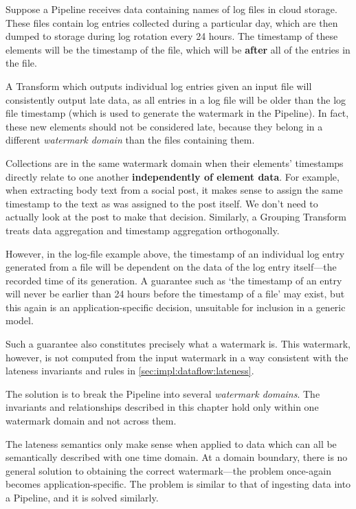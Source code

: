Suppose a Pipeline receives data containing names of log files in cloud storage.
These files contain log entries collected during a particular day, which are then dumped to storage during log rotation every 24 hours.
The timestamp of these elements will be the timestamp of the file, which will be \textbf{after} all of the entries in the file.

A Transform which outputs individual log entries given an input file will consistently output late data, as all entries in a log file will be older than the log file timestamp (which is used to generate the watermark in the Pipeline).
In fact, these new elements should not be considered late, because they belong in a different \emph{watermark domain} than the files containing them.

Collections are in the same watermark domain when their elements' timestamps directly relate to one another \textbf{independently of element data}.
For example, when extracting body text from a social post, it makes sense to assign the same timestamp to the text as was assigned to the post itself.
We don't need to actually look at the post to make that decision.
Similarly, a Grouping Transform treats data aggregation and timestamp aggregation orthogonally.


However, in the log-file example above, the timestamp of an individual log entry generated from a file will be dependent on the data of the log entry itself---the recorded time of its generation.
A guarantee such as `the timestamp of an entry will never be earlier than 24 hours before the timestamp of a file' may exist, but this again is an application-specific decision, unsuitable for inclusion in a generic model.

Such a guarantee also constitutes precisely what a watermark is.
This watermark, however, is not computed from the input watermark in a way consistent with the lateness invariants and rules in \cref{sec:impl:dataflow:lateness}.

The solution is to break the Pipeline into several \emph{watermark domains}.
The invariants and relationships described in this chapter hold only within one watermark domain and not across them.

The lateness semantics only make sense when applied to data which can all be semantically described with one time domain.
At a domain boundary, there is no general solution to obtaining the correct watermark---the problem once-again becomes application-specific.
The problem is similar to that of ingesting data into a Pipeline, and it is solved similarly.

